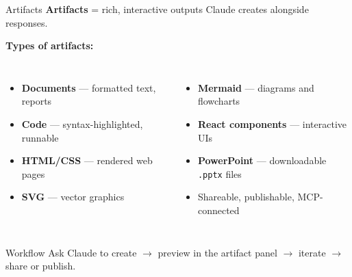 \documentclass[aspectratio=169]{beamer}
\begin{document}
\begin{frame}{Artifacts}
\textbf{Artifacts} = rich, interactive outputs Claude creates alongside responses.

\bigskip
\textbf{Types of artifacts:}
\begin{columns}[T]
\begin{itemize}
  \item \textbf{Documents} --- formatted text, reports
  \item \textbf{Code} --- syntax-highlighted, runnable
  \item \textbf{HTML/CSS} --- rendered web pages
  \item \textbf{SVG} --- vector graphics
\end{itemize}

\begin{itemize}
  \item \textbf{Mermaid} --- diagrams and flowcharts
  \item \textbf{React components} --- interactive UIs
  \item \textbf{PowerPoint} --- downloadable \texttt{.pptx} files
  \item Shareable, publishable, MCP-connected
\end{itemize}
\end{columns}

\bigskip
\begin{block}{Workflow}
Ask Claude to create $\to$ preview in the artifact panel $\to$ iterate $\to$ share or publish.
\end{block}
\end{frame}
\end{document}
